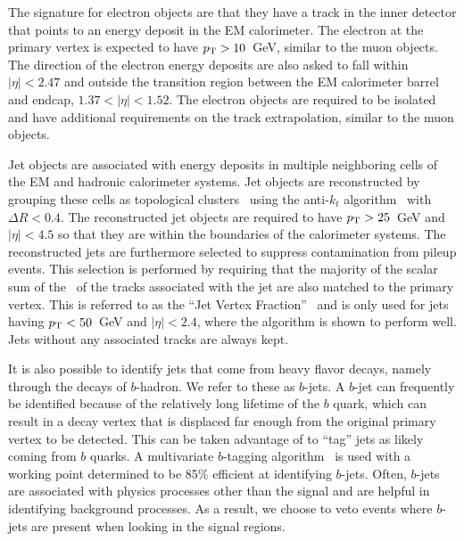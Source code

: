 The signature for electron objects are that they have a track in the inner
detector that points to an energy deposit in the EM calorimeter.
The electron at the primary vertex is expected to have $p_{\mathrm{T}}>10$~GeV, similar
to the muon objects. The direction of the electron energy 
deposits are also asked to fall within $|\eta| < 2.47$ and outside the 
transition region between the EM calorimeter barrel and endcap, $1.37 < |\eta| < 1.52$.
The electron objects are required to be isolated and have additional
requirements on the track extrapolation, similar to the muon objects.  


Jet objects are associated with energy deposits in multiple 
neighboring cells of the EM and hadronic calorimeter systems.
Jet objects are reconstructed by grouping these cells
as topological clusters~\cite{Lampl:1099735}
using the anti-$k_t$ algorithm~\cite{Cacciari:2008gp} with $\Delta R < 0.4$.
The reconstructed jet objects are required to have 
$p_{\mathrm{T}}>25$~GeV and $|\eta|<4.5$ so that
they are within the boundaries of the calorimeter systems.
The reconstructed jets are furthermore selected to suppress 
contamination from pileup events. This selection is performed by 
requiring that the majority of the
scalar sum of the \pt~of the tracks associated with the 
jet are also matched to the primary vertex. This is referred to
as the ``Jet Vertex Fraction''~\cite{Miller:1206864, ATLAS-CONF-2013-083}
and is only used for jets having $p_{\mathrm{T}} < 50$~GeV and $|\eta|<2.4$, where
the algorithm is shown to perform well. Jets without any associated
tracks are always kept. 

It is also possible to identify jets that come from heavy flavor
decays, namely through the decays of $b$-hadron. We refer
to these as $b$-jets. A $b$-jet can frequently be identified 
because of the relatively long lifetime of the $b$ quark, which can 
result in a decay vertex that is displaced far enough
from the original primary vertex to be detected.
This can be taken advantage of to ``tag'' jets as likely coming from
$b$ quarks. A multivariate $b$-tagging algorithm~\cite{ATLAS-CONF-2014-004}
is used with a working point determined to be 85\% efficient at
identifying $b$-jets. %
Often, $b$-jets are associated with physics processes other than the signal
and are helpful in identifying background processes.
As a result, we choose to veto events where 
$b$-jets are present when looking in the signal regions.


